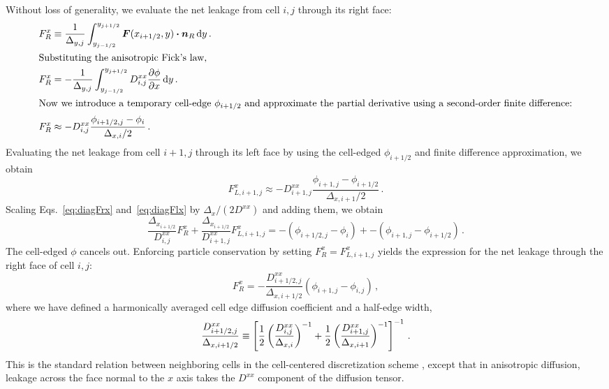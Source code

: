 Without loss of generality, we evaluate the net leakage from cell
$i,j$ through its right face:
\begin{align} \nonumber
  F_R^x &\equiv \frac{1}{\Delta_{y,j}} \int_{y_{j-1/2}}^{y_{j+1/2}}
  \bm{F}(x_{i+1/2}, y) \bm{\cdot} \bm{n}_R \mathop{}\!\mathrm{d} y\,.
  \\
  \intertext{Substituting the anisotropic Fick's law,} \nonumber
  F_R^x &= - \frac{1}{\Delta_{y,j}} \int_{y_{j-1/2}}^{y_{j+1/2}}
  D_{i,j}^{xx} \frac{\partial \phi}{\partial x} \mathop{}\!\mathrm{d} y \,.
  \\ 
  \intertext{Now we introduce a temporary cell-edge $\phi_{i+1/2}$ and
  approximate the partial derivative using a second-order finite difference:}
  \label{eq:diagFrx}
  F_R^x &\approx - 
  D_{i,j}^{xx} \frac{\phi_{i+1/2,j} - \phi_{i}}{\Delta_{x,i}/2} \,.
\end{align}
Evaluating the net leakage from cell $i+1,j$ through its left face by using the
cell-edged $\phi_{i+1/2}$ and finite difference approximation, we obtain
\begin{equation}\label{eq:diagFlx}
  F_{L,i+1,j}^x \approx - 
  D_{i+1,j}^{xx} \frac{\phi_{i+1,j} - \phi_{i+1/2}}{\Delta_{x,i+1}/2} \,.
\end{equation}
Scaling Eqs.~\eqref{eq:diagFrx} and~\eqref{eq:diagFlx} by $\Delta_x/(2 D^{xx})$
and adding them, we obtain
\begin{equation*}
  \frac{\Delta_{x_{i+1/2}}}{D_{i,j}^{xx}}F_R^x
 + \frac{\Delta_{x_{i+1/2}}}{D_{i+1,j}^{xx}}F_{L,i+1,j}^x
 = -(\phi_{i+1/2,j} - \phi_{i}) + -(\phi_{i+1,j} - \phi_{i+1/2})\,.
\end{equation*}
The cell-edged $\phi$ cancels out. Enforcing particle conservation by
setting $F_R^x = F_{L,i+1,j}^x$ yields the expression for the net leakage
through the right face of cell $i,j$:
\begin{equation}\label{eq:diagRight}
  F_R^x= -\frac{D^{xx}_{i+1/2,j}}{\Delta_{x,i+1/2}}
  \left( \phi_{i+1,j} - \phi_{i,j} \right)\,,
\end{equation}
where we have defined a harmonically averaged cell edge diffusion coefficient
and a half-edge width,
\begin{equation} \label{eq:cellEdgeDHarmonic}
  \frac{D^{xx}_{i+1/2,j}}{\Delta_{x,i+1/2}} \equiv \left[
  \frac12 \left( \frac{D^{xx}_{i,j}}{\Delta_{x,i}} \right)^{-1}
 + \frac12 \left( \frac{D^{xx}_{i+1,j}}{\Delta_{x,i+1}} \right)^{-1}
  \right]^{-1}\,.
\end{equation}
This is the standard relation between neighboring cells in the
cell-centered discretization scheme \cite{Dud1976}, except that in anisotropic
diffusion, leakage across the face normal to the $x$ axis takes the $D^{xx}$
component of the diffusion tensor.

